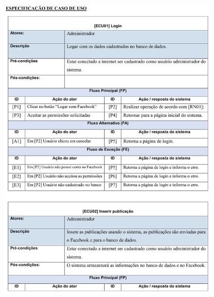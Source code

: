 \begin{figure}
    \includegraphics[width=\textwidth]{documentacao/ModeloArtefatos-06.jpg}
\end{figure}

